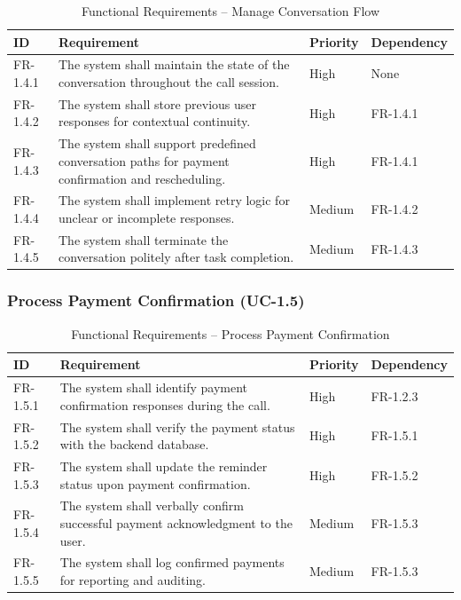 \documentclass[12pt,a4paper]{report}
\begin{document}
\begin{table}[H]
\centering
\caption{Functional Requirements – Manage Conversation Flow}
\begin{tabularx}{\textwidth}{|l|X|l|l|}
\hline
\textbf{ID} & \textbf{Requirement} & \textbf{Priority} & \textbf{Dependency} \\ \hline

FR-1.4.1 & The system shall maintain the state of the conversation throughout the call session. & High & None \\ \hline

FR-1.4.2 & The system shall store previous user responses for contextual continuity. & High & FR-1.4.1 \\ \hline

FR-1.4.3 & The system shall support predefined conversation paths for payment confirmation and rescheduling. & High & FR-1.4.1 \\ \hline

FR-1.4.4 & The system shall implement retry logic for unclear or incomplete responses. & Medium & FR-1.4.2 \\ \hline

FR-1.4.5 & The system shall terminate the conversation politely after task completion. & Medium & FR-1.4.3 \\ \hline

\end{tabularx}
\end{table}
\subsubsection{Process Payment Confirmation (UC-1.5)}

\begin{table}[H]
\centering
\caption{Functional Requirements – Process Payment Confirmation}
\begin{tabularx}{\textwidth}{|l|X|l|l|}
\hline
\textbf{ID} & \textbf{Requirement} & \textbf{Priority} & \textbf{Dependency} \\ \hline

FR-1.5.1 & The system shall identify payment confirmation responses during the call. & High & FR-1.2.3 \\ \hline

FR-1.5.2 & The system shall verify the payment status with the backend database. & High & FR-1.5.1 \\ \hline

FR-1.5.3 & The system shall update the reminder status upon payment confirmation. & High & FR-1.5.2 \\ \hline

FR-1.5.4 & The system shall verbally confirm successful payment acknowledgment to the user. & Medium & FR-1.5.3 \\ \hline

FR-1.5.5 & The system shall log confirmed payments for reporting and auditing. & Medium & FR-1.5.3 \\ \hline

\end{tabularx}
\end{table}
\end{document}
